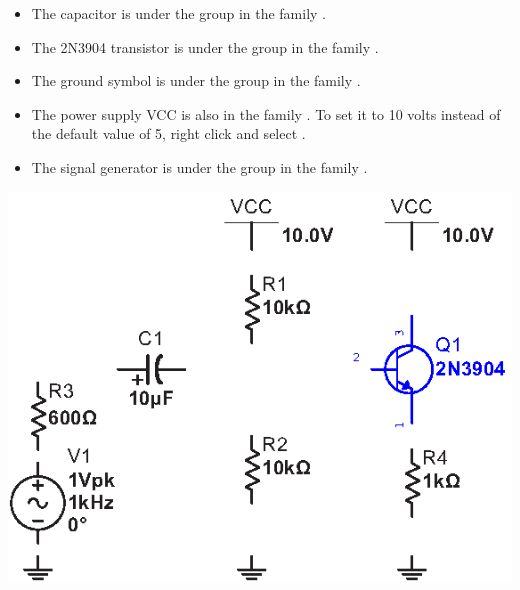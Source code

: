 \begin{enumerate}[wide]
\begin{itemize}
\item The capacitor is under the group  in the family .  

\item The 2N3904 transistor is under the group  in the family .

\item The ground symbol is under the group  in the family .

\item The power supply VCC is also in the family .  To set it to 10 volts instead of the default value of 5, right click and select .

\item The signal generator is under the group  in the family .

\end{itemize}
\begin{center}
\includegraphics{multisim/more_components.eps}
\end{center}


\end{enumerate}

